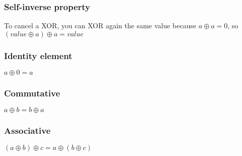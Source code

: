 \documentclass{article}
\begin{document}
\subsubsection{Self-inverse property}
To cancel a XOR, you can XOR again the same value because $a \oplus a = 0$, so $(value \oplus a) \oplus a = value$

\subsubsection{Identity element}
$a \oplus 0 = a$

\subsubsection{Commutative}
$a \oplus b = b \oplus a$

\subsubsection{Associative}
$(a \oplus b) \oplus c = a \oplus (b \oplus c)$
\end{document}
